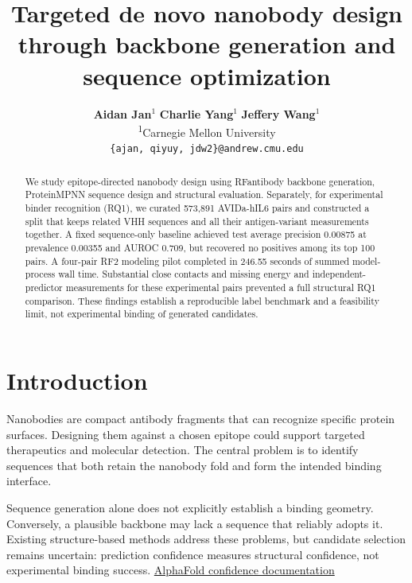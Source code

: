 \documentclass[11pt, logo, nonumbering]{preprint}
\begin{document}
\title{Targeted de novo nanobody design through backbone generation and sequence optimization} 
 

\author{
\textbf{Aidan Jan}$^{1}$ \quad
\textbf{Charlie Yang}$^{1}$ \quad
\textbf{Jeffery Wang}$^{1}$ \\
\textsuperscript{1}Carnegie Mellon University\\
\texttt{\{ajan, qiyuy, jdw2\}@andrew.cmu.edu} \\
}

\maketitle


\begin{abstract}
We study epitope-directed nanobody design using RFantibody backbone generation,
ProteinMPNN sequence design and structural evaluation. Separately, for
experimental binder recognition (RQ1), we curated 573,891 AVIDa-hIL6 pairs and
constructed a split that keeps related VHH sequences and all their antigen-variant
measurements together. A fixed sequence-only baseline achieved test average
precision 0.00875 at prevalence 0.00355 and AUROC 0.709, but recovered no positives
among its top 100 pairs. A four-pair RF2 modeling pilot completed in 246.55 seconds
of summed model-process wall time. Substantial close contacts and missing energy
and independent-predictor measurements for these experimental pairs prevented
a full structural RQ1 comparison. These findings establish a reproducible label
benchmark and a feasibility limit, not experimental binding of generated candidates.
\end{abstract}

\section{Introduction}
\label{sec:intro}
Nanobodies are compact antibody fragments that can recognize specific protein surfaces. Designing them against a chosen epitope could support targeted therapeutics and molecular detection. The central problem is to identify sequences that both retain the nanobody fold and form the intended binding interface.


Sequence generation alone does not explicitly establish a binding geometry. Conversely, a plausible backbone may lack a sequence that reliably adopts it. Existing structure-based methods address these problems, but candidate selection remains uncertain: prediction confidence measures structural confidence, not experimental binding success. \href{https://www.ebi.ac.uk/training/online/courses/alphafold/inputs-and-outputs/evaluating-alphafolds-predicted-structures-using-confidence-scores/confidence-scores-in-alphafold-multimer/}{AlphaFold confidence documentation}
\end{document}

